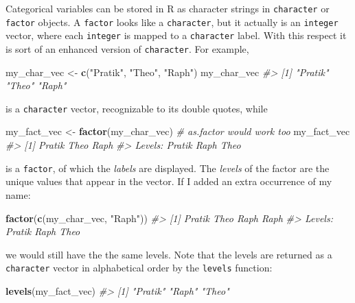 \documentclass[]{book}
\newenvironment{Shaded}{}{}
\newcommand{\CommentTok}[1]{\textcolor[rgb]{0.38,0.63,0.69}{\textit{#1}}}
\newcommand{\KeywordTok}[1]{\textcolor[rgb]{0.00,0.44,0.13}{\textbf{#1}}}
\newcommand{\NormalTok}[1]{#1}
\newcommand{\StringTok}[1]{\textcolor[rgb]{0.25,0.44,0.63}{#1}}
\begin{document}
Categorical variables can be stored in R as character strings in \texttt{character} or \texttt{factor} objects. A \texttt{factor} looks like a \texttt{character}, but it actually is an \texttt{integer} vector, where each \texttt{integer} is mapped to a \texttt{character} label. With this respect it is sort of an enhanced version of \texttt{character}. For example,

\begin{Shaded}
\begin{Highlighting}[]
\NormalTok{my_char_vec <-}\StringTok{ }\KeywordTok{c}\NormalTok{(}\StringTok{"Pratik"}\NormalTok{, }\StringTok{"Theo"}\NormalTok{, }\StringTok{"Raph"}\NormalTok{)}
\NormalTok{my_char_vec}
\CommentTok{#> [1] "Pratik" "Theo"   "Raph"}
\end{Highlighting}
\end{Shaded}

is a \texttt{character} vector, recognizable to its double quotes, while

\begin{Shaded}
\begin{Highlighting}[]
\NormalTok{my_fact_vec <-}\StringTok{ }\KeywordTok{factor}\NormalTok{(my_char_vec) }\CommentTok{# as.factor would work too}
\NormalTok{my_fact_vec}
\CommentTok{#> [1] Pratik Theo   Raph  }
\CommentTok{#> Levels: Pratik Raph Theo}
\end{Highlighting}
\end{Shaded}

is a \texttt{factor}, of which the \emph{labels} are displayed. The \emph{levels} of the factor are the unique values that appear in the vector. If I added an extra occurrence of my name:

\begin{Shaded}
\begin{Highlighting}[]
\KeywordTok{factor}\NormalTok{(}\KeywordTok{c}\NormalTok{(my_char_vec, }\StringTok{"Raph"}\NormalTok{))}
\CommentTok{#> [1] Pratik Theo   Raph   Raph  }
\CommentTok{#> Levels: Pratik Raph Theo}
\end{Highlighting}
\end{Shaded}

we would still have the the same levels. Note that the levels are returned as a \texttt{character} vector in alphabetical order by the \texttt{levels} function:

\begin{Shaded}
\begin{Highlighting}[]
\KeywordTok{levels}\NormalTok{(my_fact_vec)}
\CommentTok{#> [1] "Pratik" "Raph"   "Theo"}
\end{Highlighting}
\end{Shaded}
\end{document}
